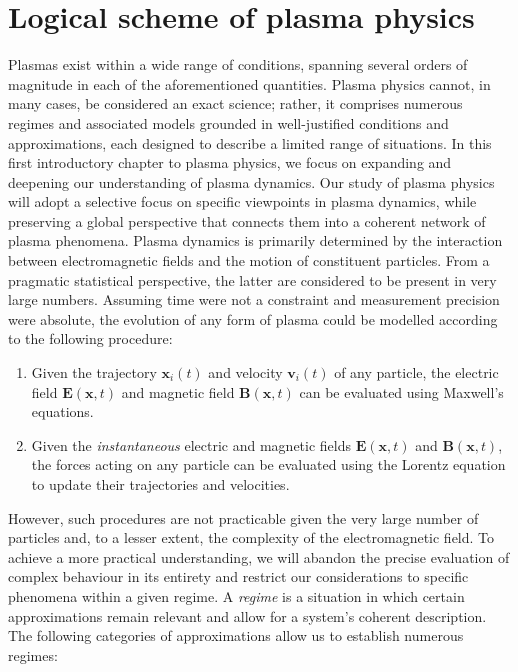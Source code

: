\section{Logical scheme of plasma physics}

Plasmas exist within a wide range of conditions, spanning several orders of magnitude in each of the aforementioned quantities. Plasma physics cannot, in many cases, be considered an exact science; rather, it comprises numerous regimes and associated models grounded in well-justified conditions and approximations, each designed to describe a limited range of situations. In this first introductory chapter to plasma physics, we focus on expanding and deepening our understanding of plasma dynamics. Our study of plasma physics will adopt a selective focus on specific viewpoints in plasma dynamics, while preserving a global perspective that connects them into a coherent network of plasma phenomena. Plasma dynamics is primarily determined by the interaction between electromagnetic fields and the motion of constituent particles. From a pragmatic statistical perspective, the latter are considered to be present in very large numbers. Assuming time were not a constraint and measurement precision were absolute, the evolution of any form of plasma could be modelled according to the following procedure:

\begin{enumerate}
    \item Given the trajectory $\mathbf{x}_i(t)$ and velocity $\mathbf{v}_i(t)$ of any particle, the electric field $\mathbf{E}(\mathbf{x},t)$ and magnetic field $\mathbf{B}(\mathbf{x},t)$ can be evaluated using Maxwell's equations.
    \item Given the \textit{instantaneous} electric and magnetic fields $\mathbf{E}(\mathbf{x},t)$ and $\mathbf{B}(\mathbf{x},t)$, the forces acting on any particle can be evaluated using the Lorentz equation to update their trajectories and velocities.
\end{enumerate}

However, such procedures are not practicable given the very large number of particles and, to a lesser extent, the complexity of the electromagnetic field. To achieve a more practical understanding, we will abandon the precise evaluation of complex behaviour in its entirety and restrict our considerations to specific phenomena within a given regime. A \textit{regime} is a situation in which certain approximations remain relevant and allow for a system's coherent description. The following categories of approximations allow us to establish numerous regimes:

